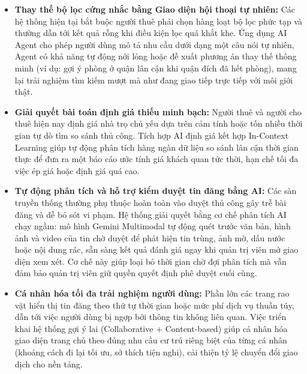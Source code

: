 \begin{itemize}
    \item \textbf{Thay thế bộ lọc cứng nhắc bằng Giao diện hội thoại tự nhiên:} Các hệ thống hiện tại bắt buộc người thuê phải chọn hàng loạt bộ lọc phức tạp và thường dẫn tới kết quả rỗng khi điều kiện lọc quá khắt khe. Ứng dụng AI Agent cho phép người dùng mô tả nhu cầu dưới dạng một câu nói tự nhiên, Agent có khả năng tự động nới lỏng hoặc đề xuất phương án thay thế thông minh (ví dụ: gợi ý phòng ở quận lân cận khi quận đích đã hết phòng), mang lại trải nghiệm tìm kiếm mượt mà như đang giao tiếp trực tiếp với môi giới thật.
    \item \textbf{Giải quyết bài toán định giá thiếu minh bạch:} Người thuê và người cho thuê hiện nay định giá nhà trọ chủ yếu dựa trên cảm tính hoặc tốn nhiều thời gian tự dò tìm so sánh thủ công. Tích hợp AI định giá kết hợp In-Context Learning giúp tự động phân tích hàng ngàn dữ liệu so sánh lân cận thời gian thực để đưa ra một báo cáo ước tính giá khách quan tức thời, hạn chế tối đa việc ép giá hoặc định giá quá cao.
    \item \textbf{Tự động phân tích và hỗ trợ kiểm duyệt tin đăng bằng AI:} Các sàn truyền thống thường phụ thuộc hoàn toàn vào duyệt thủ công gây trễ bài đăng và dễ bỏ sót vi phạm. Hệ thống giải quyết bằng cơ chế phân tích AI chạy ngầm: mô hình Gemini Multimodal tự động quét trước văn bản, hình ảnh và video của tin chờ duyệt để phát hiện tin trùng, ảnh mờ, dấu nước hoặc nội dung rác, sẵn sàng kết quả đánh giá ngay khi quản trị viên mở giao diện xem xét. Cơ chế này giúp loại bỏ thời gian chờ đợi phân tích mà vẫn đảm bảo quản trị viên giữ quyền quyết định phê duyệt cuối cùng.
    \item \textbf{Cá nhân hóa tối đa trải nghiệm người dùng:} Phần lớn các trang rao vặt hiển thị tin đăng theo thứ tự thời gian hoặc mức phí dịch vụ thuần túy, dẫn tới việc người dùng bị ngợp bởi thông tin không liên quan. Việc triển khai hệ thống gợi ý lai (Collaborative + Content-based) giúp cá nhân hóa giao diện trang chủ theo đúng nhu cầu cư trú riêng biệt của từng cá nhân (khoảng cách đi lại tối ưu, sở thích tiện nghi), cải thiện tỷ lệ chuyển đổi giao dịch cho nền tảng.
\end{itemize}
